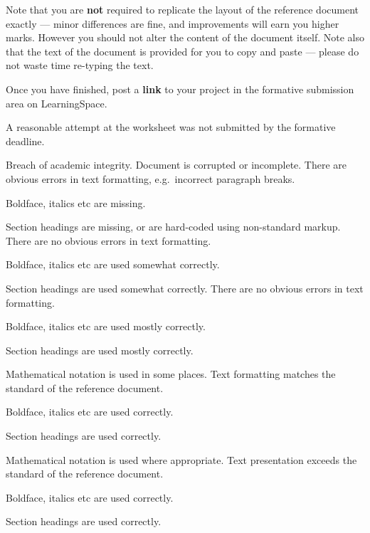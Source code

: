 \documentclass{../../../fal_assignment}
\begin{document}
Note that you are \textbf{not} required to replicate the layout of the reference document exactly --- minor differences are fine,
and improvements will earn you higher marks.
However you should not alter the content of the document itself.
Note also that the text of the document is provided for you to copy and paste --- please do not waste time re-typing the text.

Once you have finished, post a \textbf{link} to your project in the formative submission area on LearningSpace.

\begin{markingrubric}
        \grade\fail	A reasonable attempt at the worksheet was not submitted by the formative deadline.
        \par Breach of academic integrity.
        \grade\fail Document is corrupted or incomplete.
        \grade There are obvious errors in text formatting, e.g.\ incorrect paragraph breaks.
			\par Boldface, italics etc are missing.
			\par Section headings are missing, or are hard-coded using non-standard markup.
		\grade There are no obvious errors in text formatting.
			\par Boldface, italics etc are used somewhat correctly.
			\par Section headings are used somewhat correctly.
		\grade There are no obvious errors in text formatting.
			\par Boldface, italics etc are used mostly correctly.
			\par Section headings are used mostly correctly.
			\par Mathematical notation is used in some places.
		\grade Text formatting matches the standard of the reference document.
			\par Boldface, italics etc are used correctly.
			\par Section headings are used correctly.
			\par Mathematical notation is used where appropriate.
		\grade Text presentation exceeds the standard of the reference document.
			\par Boldface, italics etc are used correctly.
			\par Section headings are used correctly.

\end{markingrubric}
\end{document}
